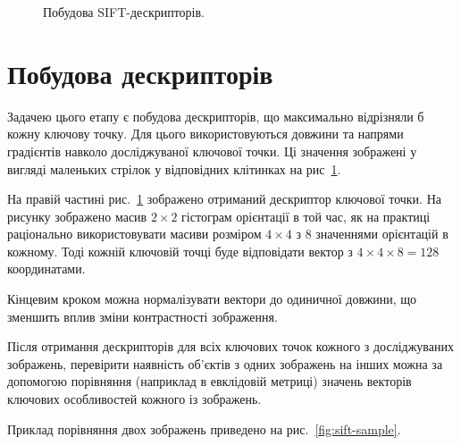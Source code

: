 \begin{figure}[h]
  \begin{minipage}[h]{0.49\linewidth}
  \end{minipage}
  \hfill
  \begin{minipage}[h]{0.49\linewidth}
  \end{minipage}
  \caption{Побудова SIFT-дескрипторів.}
  \label{fig:sift-descriptor}
\end{figure}

\section{Побудова дескрипторів}

Задачею цього етапу є побудова дескрипторів, що максимально відрізняли б кожну ключову точку. Для цього використовуються довжини та напрями градієнтів навколо досліджуваної ключової точки. Ці значення зображені у вигляді маленьких стрілок у відповідних клітинках на рис~\ref{fig:sift-descriptor}.

На правій частині рис.~\ref{fig:sift-descriptor} зображено отриманий дескриптор ключової точки. На рисунку зображено масив $2\times2$ гістограм орієнтації в той час, як на практиці раціонально використовувати масиви розміром $4\times4$ з 8 значеннями орієнтацій в кожному. Тоді кожній ключовій точці буде відповідати вектор з $4\times4\times8=128$ координатами. 

Кінцевим кроком можна нормалізувати вектори до одиничної довжини, що зменшить вплив зміни контрастності зображення.

Після отримання дескрипторів для всіх ключових точок кожного з досліджуваних зображень, перевірити наявність об'єктів з одних зображень на інших можна за допомогою порівняння (наприклад в евклідовій метриці) значень векторів ключових особливостей кожного із зображень. 

Приклад порівняння двох зображень приведено на рис.~\ref{fig:sift-sample}.

